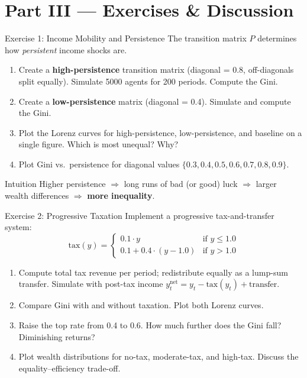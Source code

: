 \documentclass[aspectratio=169, 10pt]{beamer}
\begin{document}
\section{Part III --- Exercises \& Discussion}

\begin{frame}{Exercise 1: Income Mobility and Persistence}
The transition matrix $P$ determines how \textit{persistent} income shocks are.
\vspace{0.5em}
\begin{enumerate}
  \item[(a)] Create a \textbf{high-persistence} transition matrix
    (diagonal = 0.8, off-diagonals split equally). Simulate 5000 agents
    for 200 periods. Compute the Gini.
  \item[(b)] Create a \textbf{low-persistence} matrix (diagonal = 0.4).
    Simulate and compute the Gini.
  \item[(c)] Plot the Lorenz curves for high-persistence, low-persistence,
    and baseline on a single figure. Which is most unequal? Why?
  \item[(d)] Plot Gini vs.\ persistence for diagonal values
    $\{0.3, 0.4, 0.5, 0.6, 0.7, 0.8, 0.9\}$.
\end{enumerate}
\vspace{0.5em}
\begin{alertblock}{Intuition}
Higher persistence $\Rightarrow$ long runs of bad (or good) luck
$\Rightarrow$ larger wealth differences $\Rightarrow$ \textbf{more inequality}.
\end{alertblock}
\end{frame}

\begin{frame}{Exercise 2: Progressive Taxation}
Implement a progressive tax-and-transfer system:
\[
\text{tax}(y) = \begin{cases}
0.1 \cdot y & \text{if } y \leq 1.0 \\[3pt]
0.1 + 0.4 \cdot (y - 1.0) & \text{if } y > 1.0
\end{cases}
\]
\vspace{0.3em}
\begin{enumerate}
  \item[(a)] Compute total tax revenue per period; redistribute equally
    as a lump-sum transfer. Simulate with post-tax income
    $y_t^{\text{net}} = y_t - \text{tax}(y_t) + \text{transfer}$.
  \item[(b)] Compare Gini with and without taxation.
    Plot both Lorenz curves.
  \item[(c)] Raise the top rate from 0.4 to 0.6. How much further
    does the Gini fall? Diminishing returns?
  \item[(d)] Plot wealth distributions for no-tax, moderate-tax,
    and high-tax. Discuss the equality--efficiency trade-off.
\end{enumerate}
\end{frame}
\end{document}
